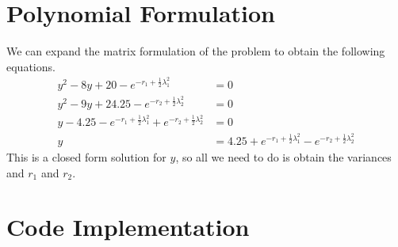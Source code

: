 \documentclass[12pt]{article}
\begin{document}
\section{Polynomial Formulation}

We can expand the matrix formulation of the problem to obtain the following equations.
\begin{align*}
    y^2-8y+20-e^{-r_1+\frac{1}{2}\lambda_1^2}&=0\\
    y^2-9y+24.25-e^{-r_2+\frac{1}{2}\lambda_2^2}&=0\\
    y-4.25-e^{-r_1+\frac{1}{2}\lambda_1^2}+e^{-r_2+\frac{1}{2}\lambda_2^2}&=0\\
    y&=4.25+e^{-r_1+\frac{1}{2}\lambda_1^2}-e^{-r_2+\frac{1}{2}\lambda_2^2}
\end{align*}
This is a closed form solution for \(y\), so all we need to do is obtain the variances
and \(r_1\) and \(r_2\).

\section{Code Implementation}
\end{document}
